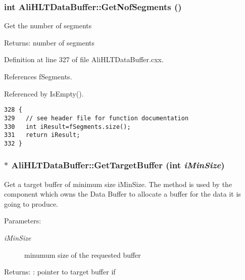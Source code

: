 \subsubsection{\setlength{\rightskip}{0pt plus 5cm}int Ali\-HLTData\-Buffer::Get\-Nof\-Segments ()}\label{classAliHLTDataBuffer_a11}


Get the number of segments \begin{Desc}
\item[Returns:]number of segments \end{Desc}


Definition at line 327 of file Ali\-HLTData\-Buffer.cxx.

References f\-Segments.

Referenced by Is\-Empty().

\footnotesize\begin{verbatim}328 {
329   // see header file for function documentation
330   int iResult=fSegments.size();
331   return iResult;
332 }
\end{verbatim}\normalsize 


\subsubsection{ $\ast$ Ali\-HLTData\-Buffer::Get\-Target\-Buffer (int {\em i\-Min\-Size})}\label{classAliHLTDataBuffer_a8}


Get a target buffer of minimum size i\-Min\-Size. The method is used by the component which owns the Data Buffer to allocate a buffer for the data it is going to produce. \begin{Desc}
\item[Parameters:]
\begin{description}
\item[{\em i\-Min\-Size}]minumum size of the requested buffer \end{description}
\end{Desc}
\begin{Desc}
\item[Returns:]: pointer to target buffer if \end{Desc}


